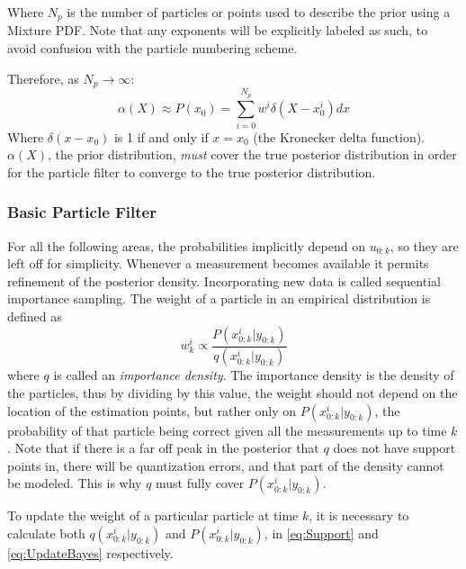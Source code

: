 \documentclass[journal]{./IEEEtran}
\begin{document}
Where $N_p$ is the number of particles or points used to 
describe the prior using a Mixture PDF.  Note that any 
exponents will be explicitly labeled as such, to avoid 
confusion with the particle numbering scheme. 

Therefore, as $N_p \rightarrow \infty$:
\begin{equation}
\alpha(X) \approx P(x_0) = \sum_{i=0}^{N_p} w^i\delta(X - x^i_0 ) dx
\end{equation}
Where $\delta(x-x_0)$ is 1 if and only if $x = x_0$
(the Kronecker delta function).
$\alpha(X)$, the prior distribution, \emph{must} cover the 
true posterior distribution in order for the particle filter
to converge to the true posterior distribution.

\subsubsection{Basic Particle Filter}
For all the following areas, the probabilities implicitly depend on $u_{0:k}$, 
so they are left off for simplicity.
Whenever a measurement becomes available it permits refinement of the
posterior density.  Incorporating new data is called sequential 
importance sampling. The weight of a particle in an empirical distribution
is defined as
\begin{equation}
w^i_k \propto \frac{P(x^i_{0:k} | y_{0:k})}{q(x^i_{0:k} | y_{0:k})}
\label{eq:weightfunc}
\end{equation}
where $q$ is called an \emph{importance density}. The importance density
is the density of the particles, thus by dividing by this value, the weight
should not depend on the location of the estimation points, but rather
only on $P(x^i_{0:k} | y_{0:k})$, the probability of that particle
being correct given all the measurements up to time $k$. 
Note that if there is a far off peak in
the posterior that $q$ does not have support points in, there will 
be quantization errors, and that part of the density cannot be modeled. 
This is why $q$ must fully cover $P(x^i_{0:k} | y_{0:k})$.

To update the weight of a particular particle at time $k$, it is necessary to 
calculate both $q(x^i_{0:k} | y_{0:k})$ and $P(x^i_{0:k} | y_{0:k})$, 
in \autoref{eq:Support} and \autoref{eq:UpdateBayes} respectively.
\end{document}
